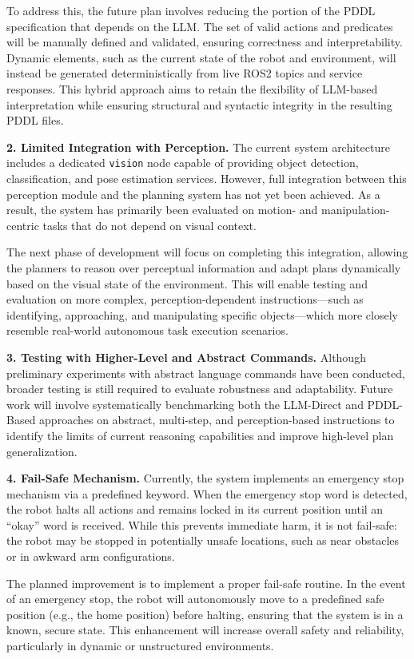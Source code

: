 \documentclass[12pt]{extarticle}
\begin{document}
To address this, the future plan involves reducing the portion of the PDDL specification that depends on the LLM. The set of valid actions and predicates will be manually defined and validated, ensuring correctness and interpretability. Dynamic elements, such as the current state of the robot and environment, will instead be generated deterministically from live ROS2 topics and service responses. This hybrid approach aims to retain the flexibility of LLM-based interpretation while ensuring structural and syntactic integrity in the resulting PDDL files.

\textbf{2. Limited Integration with Perception.}
The current system architecture includes a dedicated \texttt{vision} node capable of providing object detection, classification, and pose estimation services. However, full integration between this perception module and the planning system has not yet been achieved. As a result, the system has primarily been evaluated on motion- and manipulation-centric tasks that do not depend on visual context.

The next phase of development will focus on completing this integration, allowing the planners to reason over perceptual information and adapt plans dynamically based on the visual state of the environment. This will enable testing and evaluation on more complex, perception-dependent instructions—such as identifying, approaching, and manipulating specific objects—which more closely resemble real-world autonomous task execution scenarios.

\textbf{3. Testing with Higher-Level and Abstract Commands.}
Although preliminary experiments with abstract language commands have been conducted, broader testing is still required to evaluate robustness and adaptability. Future work will involve systematically benchmarking both the LLM-Direct and PDDL-Based approaches on abstract, multi-step, and perception-based instructions to identify the limits of current reasoning capabilities and improve high-level plan generalization.

\textbf{4. Fail-Safe Mechanism.}
Currently, the system implements an emergency stop mechanism via a predefined keyword. When the emergency stop word is detected, the robot halts all actions and remains locked in its current position until an “okay” word is received. While this prevents immediate harm, it is not fail-safe: the robot may be stopped in potentially unsafe locations, such as near obstacles or in awkward arm configurations.

The planned improvement is to implement a proper fail-safe routine. In the event of an emergency stop, the robot will autonomously move to a predefined safe position (e.g., the home position) before halting, ensuring that the system is in a known, secure state. This enhancement will increase overall safety and reliability, particularly in dynamic or unstructured environments.
\end{document}
